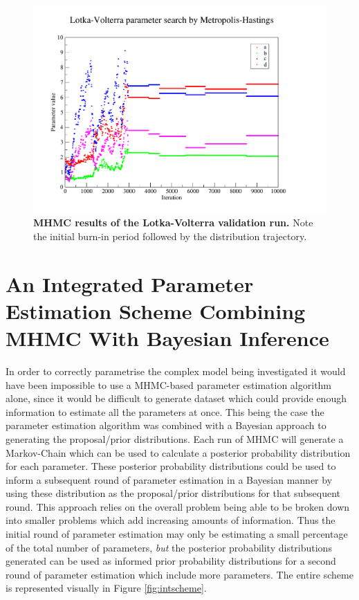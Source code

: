 \begin{figure}[tbp]
 \centering
 \includegraphics[width=13cm, trim=50px 35px 125px 30px, clip=true]{./03-parameterestimationmethodologies/data/LV_MCMC.pdf}
 \caption[{MHMC results of the Lotka-Volterra validation run.}]{{\bf MHMC results of the Lotka-Volterra validation run.} Note the initial burn-in period followed by the distribution trajectory.
 \label{fig:parameters}}
\end{figure}
\afterpage{\clearpage}

\section{An Integrated Parameter Estimation Scheme Combining MHMC With Bayesian Inference}
In order to correctly parametrise the complex model being investigated it would have been impossible to use a MHMC-based parameter estimation algorithm alone, since it would be difficult to generate dataset which could provide enough information to estimate all the parameters at once. This being the case the parameter estimation algorithm was combined with a Bayesian approach to generating the proposal/prior distributions. Each run of MHMC will generate a Markov-Chain which can be used to calculate a posterior probability distribution for each parameter. These posterior probability distributions could be used to inform a subsequent round of parameter estimation in a Bayesian manner by using these distribution as the proposal/prior distributions for that subsequent round. This approach relies on the overall problem being able to be broken down into smaller problems which add increasing amounts of information. Thus the initial round of parameter estimation may only be estimating a small percentage of the total number of parameters, \textit{but} the posterior probability distributions generated can be used as informed prior probability distributions for a second round of parameter estimation which include more parameters. The entire scheme is represented visually in Figure \ref{fig:intscheme}.

